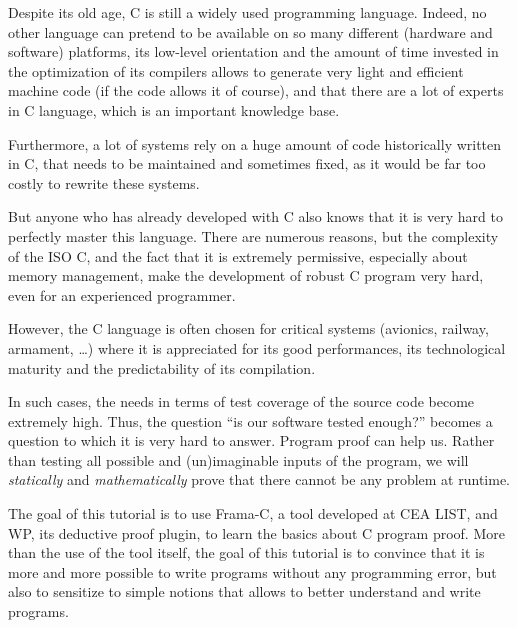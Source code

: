 \newpage

Despite its old age, C is still a widely used programming language.
Indeed, no other language can pretend to be available on so many
different (hardware and software) platforms, its low-level orientation
and the amount of time invested in the optimization of its compilers
allows to generate very light and efficient machine code (if the code
allows it of course), and that there are a lot of experts in C language,
which is an important knowledge base.


Furthermore, a lot of systems rely on a huge amount of code historically
written in C, that needs to be maintained and sometimes fixed, as it
would be far too costly to rewrite these systems.


But anyone who has already developed with C also knows that it is very
hard to perfectly master this language. There are numerous reasons, but
the complexity of the ISO C, and the fact that it is extremely permissive,
especially about memory management, make the development of robust C
program very hard, even for an experienced programmer.



However, the C language is often chosen for critical systems (avionics,
railway, armament, \ldots{}) where it is appreciated for its good
performances, its technological maturity and the predictability of its
compilation.



In such cases, the needs in terms of test coverage of the source code
become extremely high. Thus, the question ``is our software tested
enough?'' becomes a question to which it is very hard to answer. Program
proof can help us.
Rather than testing all possible and (un)imaginable inputs of the program,
we will \emph{statically} and \emph{mathematically} prove that there
cannot be any problem at runtime.



The goal of this tutorial is to use Frama-C, a tool developed at CEA
LIST, and WP, its deductive proof plugin, to learn the basics about C
program proof. More than the use of the tool itself, the goal of this
tutorial is to convince that it is more and more possible to write
programs without any programming error, but also to sensitize to simple
notions that allows to better understand and write programs.



